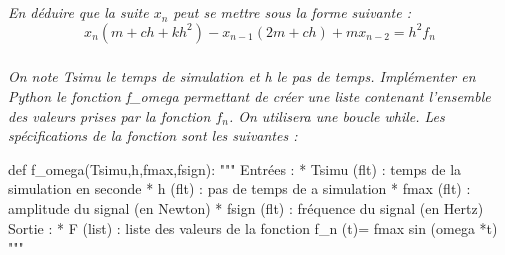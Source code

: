 \documentclass[10pt]{article}
\newif\ifprof
\begin{document}
\subparagraph{}
\textit{En déduire que la suite $x_n$ peut se mettre sous la forme suivante :}
$$
x_{n}\left(m +ch+ kh^2\right)-x_{n-1}(2m+ch) +mx_{n-2}= h^2f_n
$$

\ifprof
\begin{corrige}

D'après la question 2 on a :
$$v_n = \dfrac{x_{n}-x_{n-1}}{h} \quad \text{et} \quad v_{n-1} = \dfrac{x_{n-1}-x_{n-2}}{h}$$ 

En utilisant le résultat de la question 3, on a :
$$
m\dfrac{x_{n}-x_{n-1}}{h}  = hf_n -  (kh+c) \cdot x_n + m\dfrac{x_{n-1}-x_{n-2}}{h}+cx_{n-1}
$$

$$
\Longleftrightarrow 
m(x_{n}-x_{n-1}) = h^2f_n -  h(kh+c) \cdot x_n + m(x_{n-1}-x_{n-2})+chx_{n-1}
$$

$$
\Longleftrightarrow 
m(x_{n}-x_{n-1}) +  h(kh+c) \cdot x_n - m(x_{n-1}-x_{n-2})-chx_{n-1} = h^2f_n 
$$


$$
\Longleftrightarrow 
x_{n}\left(m +kh^2+ch\right)-x_{n-1}(2m+ch) +mx_{n-2} = h^2f_n 
$$

$$
\Longleftrightarrow 
x_{n}= \dfrac{1}{m +kh^2+ch} \left(h^2f_n +x_{n-1}(2m+ch) -mx_{n-2} \right)
$$

\end{corrige}
\else
\fi



\subparagraph{}
\textit{On note \textsf{Tsimu} le temps de simulation et \textsf{h} le pas de temps. Implémenter en Python le fonction \textsf{f\_omega} 
permettant de créer une liste contenant l'ensemble des valeurs prises par la fonction $f_n$. On utilisera une boucle \textsf{while}. Les spécifications de la fonction sont les suivantes : }

\begin{py}
\begin{python}
def f_omega(Tsimu,h,fmax,fsign):
   """
   Entrées :
       * Tsimu (flt) : temps de la simulation en seconde
       * h (flt) : pas de temps de a simulation
       * fmax (flt) : amplitude du signal (en Newton)
       * fsign (flt) : fréquence du signal (en Hertz)
   Sortie : 
       * F (list) : liste des valeurs de la fonction 
          f_n (t)= fmax sin (omega *t)
   """
\end{python}
\end{py}

\ifprof
\begin{corrige}
\begin{py}
\begin{python}
def f_omega(Tsimu,h,fmax,fsign):
   """
   Entrées :
       * Tsimu (flt) : temps de la simulation en seconde
       * h (flt) : pas de temps de a simulation
       * fmax (flt) : amplitude du signal (en Newton)
       * fsign (flt) : fréquence du signal (en Hertz)
   Sortie : 
       * F (list) : liste des valeurs de la fonction 
          f_n (t)= fmax sin (omega *t)
   """
    omega  = 2*math.pi*fsign
    t=0 
    F = []
    while t<Tsimu :
        F.append(fmax*math.sin(omega*t))
        t=t+h
    return F
    
\end{python}
\end{py}

\end{corrige}
\else
\fi
\end{document}
